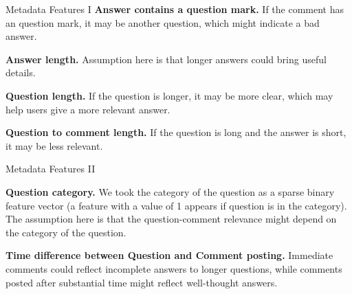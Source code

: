 \documentclass[10pt]{beamer}
\begin{document}
\begin{frame}{Metadata Features I}
\justify
\textbf{Answer contains a question mark.} If the comment has an question mark, it may be another question, which might indicate a bad answer.

\textbf{Answer length.} Assumption here is that longer answers could bring useful details.

\textbf{Question length.} If the question is longer, it may be more clear, which may help users give a more relevant answer.

\textbf{Question to comment length.} If the question is long and the answer is short, it may be less relevant.
\end{frame}

\begin{frame}{Metadata Features II}
\justify
%

\textbf{Question category.} We took the category of the question as a sparse binary feature vector (a feature with a value of 1 appears if question is in the category). The assumption here is that the question-comment relevance might depend on the category of the question.

\textbf{Time difference between Question and Comment posting.} Immediate comments could reflect incomplete answers to longer questions, while comments posted after substantial time might reflect well-thought answers.
\end{frame}

%
\end{document}
